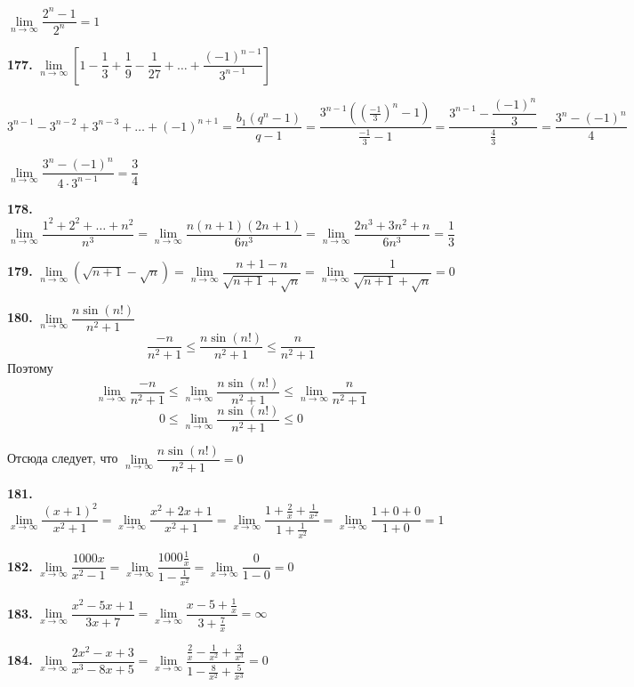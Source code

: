 \documentclass[12pt]{article}
\begin{document}
	$\lim\limits_{n\to\infty}\dfrac{2^n-1}{2^n} = 1$
	
	\medskip
	{\bf 177.} $\lim\limits_{n\to\infty} \left[1-\dfrac{1}{3}+\dfrac{1}{9}-\dfrac{1}{27}+\dots+\dfrac{(-1)^{n-1}}{3^{n-1}}\right]$
	
	$
	3^{n-1}-3^{n-2}+3^{n-3}+\dots+(-1)^{n+1} = \dfrac{b_1(q^n-1)}{q-1} = \dfrac{3^{n-1}(\left(\frac{-1}{3}\right)^n-1)}{\frac{-1}{3}-1} = \dfrac{3^{n-1}-\dfrac{(-1)^n}{3}}{\frac{4}{3}} = \dfrac{3^n - (-1)^n}{4}
	$
	
	$
	\lim\limits_{n\to\infty} \dfrac{3^n-(-1)^n}{4\cdot3^{n-1}} = \dfrac{3}{4}
	$
	
	\medskip
	{\bf 178.} $\lim\limits_{n\to\infty} \dfrac{1^2+2^2+\dots+n^2}{n^3} =\lim\limits_{n\to\infty} \dfrac{n(n+1)(2n+1)}{6n^3} = \lim\limits_{n\to\infty} \dfrac{2n^3+3n^2+n}{6n^3} = \dfrac{1}{3}$
	
	\medskip
	{\bf 179.} $\lim\limits_{n\to\infty} (\sqrt{n+1}-\sqrt{n}) = \lim\limits_{n\to\infty} \dfrac{n+1-n}{\sqrt{n+1}+\sqrt{n}} = \lim\limits_{n\to\infty} \dfrac{1}{\sqrt{n+1}+\sqrt{n}} = 0$
	
	\medskip
	{\bf 180.} $\lim\limits_{n\to\infty} \dfrac{n\sin(n!)}{n^2+1}$ 
	\[
		\dfrac{-n}{n^2+1} \le \dfrac{n\sin(n!)}{n^2+1}\le \dfrac{n}{n^2+1}
	\]
	Поэтому 
	\[
		\lim\limits_{n\to\infty}\dfrac{-n}{n^2+1} \le \lim\limits_{n\to\infty}\dfrac{n\sin(n!)}{n^2+1} \le \lim\limits_{n\to\infty}\dfrac{n}{n^2+1}
	\]
	\[
		0\le\lim\limits_{n\to\infty}\dfrac{n\sin(n!)}{n^2+1} \le 0
	\]
	
	Отсюда следует, что $\lim\limits_{n\to\infty}\dfrac{n\sin(n!)}{n^2+1} = 0$
	
	
	\medskip
	{\bf 181.} $\lim\limits_{x\to\infty}\dfrac{(x+1)^2}{x^2+1} = \lim\limits_{x\to\infty} \dfrac{x^2+2x+1}{x^2+1} = \lim\limits_{x\to\infty} \dfrac{1+\frac{2}{x}+\frac{1}{x^2}}{1+\frac{1}{x^2}} = \lim\limits_{x\to\infty} \dfrac{1+0+0}{1+0} = 1$
	
	\medskip
	{\bf 182.} $\lim\limits_{x\to\infty} \dfrac{1000x}{x^2-1} = \lim\limits_{x\to\infty} \dfrac{1000\frac{1}{x}}{1-\frac{1}{x^2}} = \lim\limits_{x\to\infty} \dfrac{0}{1-0} = 0$
	
	\medskip
	{\bf 183.} $\lim\limits_{x\to\infty} \dfrac{x^2-5x+1}{3x+7} = \lim\limits_{x\to\infty} \dfrac{x-5+\frac{1}{x}}{3+\frac{7}{x}} = \infty
$	
	
	
	\medskip
	{\bf 184.} $\lim\limits_{x\to\infty} \dfrac{2x^2-x+3}{x^3-8x+5} = \lim\limits_{x\to\infty} \dfrac{\frac{2}{x}-\frac{1}{x^2}+\frac{3}{x^3}}{1-\frac{8}{x^2}+\frac{5}{x^3}} = 0$
	
\end{document}
